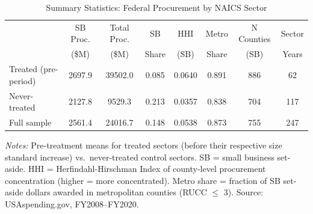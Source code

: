 \begin{table}[htbp]
\centering
\begin{threeparttable}
\caption{Summary Statistics: Federal Procurement by NAICS Sector}
\label{tab:summary}
\small
\begin{tabular}{lccccccc}
\toprule
 & SB Proc. & Total Proc. & SB & HHI & Metro & N Counties & Sector \\
 & (\$M) & (\$M) & Share & (SB) & Share & (SB) & Years \\
\midrule
Treated (pre-period) & 2697.9 & 39502.0 & 0.085 & 0.0640 & 0.891 & 886 & 62 \\
Never-treated & 2127.8 & 9529.3 & 0.213 & 0.0357 & 0.838 & 704 & 117 \\
Full sample & 2561.4 & 24016.7 & 0.148 & 0.0538 & 0.873 & 755 & 247 \\
\bottomrule
\end{tabular}
\begin{tablenotes}
\item \textit{Notes:} Pre-treatment means for treated sectors (before their respective size standard increase) vs.\ never-treated control sectors. SB = small business set-aside. HHI = Herfindahl-Hirschman Index of county-level procurement concentration (higher = more concentrated). Metro share = fraction of SB set-aside dollars awarded in metropolitan counties (RUCC $\leq$ 3). Source: USAspending.gov, FY2008--FY2020.
\end{tablenotes}
\end{threeparttable}
\end{table}
